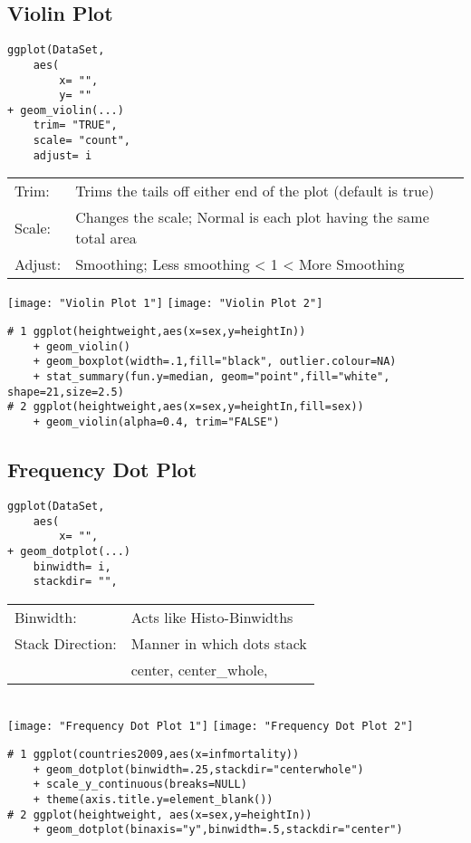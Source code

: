 \documentclass[]{article}
\begin{document}
\subsection{Violin Plot}
\begin{verbatim}
ggplot(DataSet,
	aes(
		x= "",
		y= ""
+ geom_violin(...)
	trim= "TRUE",
	scale= "count",
	adjust= i
\end{verbatim}
\begin{tabular}{l l}
	Trim: & Trims the tails off either end of the plot (default is true) \\
	Scale: & Changes the scale; Normal is each plot having the same total area \\
	Adjust: & Smoothing; Less smoothing < 1 < More Smoothing \\
\end{tabular}
\texttt{[image: "Violin Plot 1"]}
\texttt{[image: "Violin Plot 2"]} \\
\begin{verbatim}
# 1 ggplot(heightweight,aes(x=sex,y=heightIn)) 
	+ geom_violin() 
	+ geom_boxplot(width=.1,fill="black", outlier.colour=NA) 
	+ stat_summary(fun.y=median, geom="point",fill="white", shape=21,size=2.5)
# 2 ggplot(heightweight,aes(x=sex,y=heightIn,fill=sex)) 
	+ geom_violin(alpha=0.4, trim="FALSE")
\end{verbatim}

\subsection{Frequency Dot Plot}
\begin{verbatim}
ggplot(DataSet,
	aes(
		x= "",
+ geom_dotplot(...)
	binwidth= i,
	stackdir= "",
\end{verbatim}
\begin{tabular}{l l}
	Binwidth: & Acts like Histo-Binwidths \\
	Stack Direction: & Manner in which dots stack \\
		& center, center\_whole, 
\end{tabular} \\
\texttt{[image: "Frequency Dot Plot 1"]}
\texttt{[image: "Frequency Dot Plot 2"]} \\
\begin{verbatim}
# 1 ggplot(countries2009,aes(x=infmortality))
	+ geom_dotplot(binwidth=.25,stackdir="centerwhole") 
	+ scale_y_continuous(breaks=NULL) 
	+ theme(axis.title.y=element_blank())
# 2 ggplot(heightweight, aes(x=sex,y=heightIn)) 
	+ geom_dotplot(binaxis="y",binwidth=.5,stackdir="center")
\end{verbatim}
\end{document}
